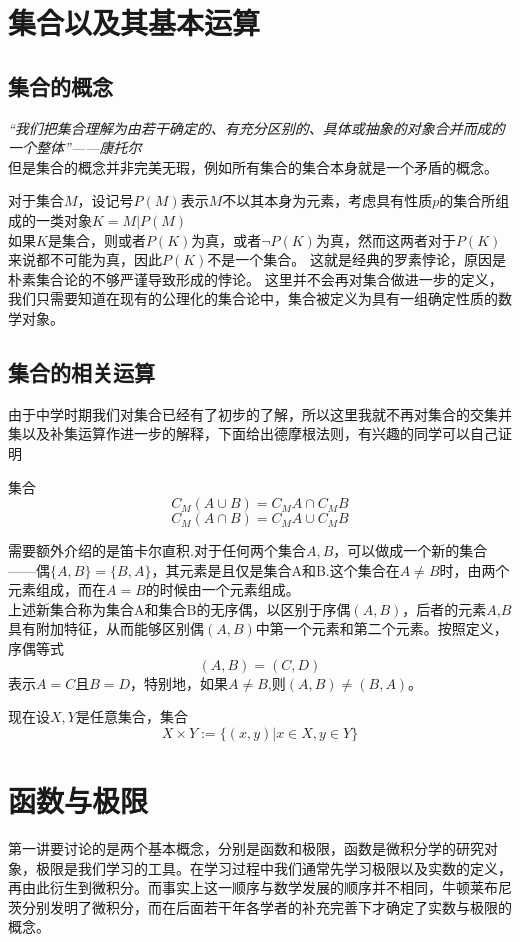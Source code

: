 \section{集合以及其基本运算}
\subsection{集合的概念}
{\large\textit{“我们把集合理解为由若干确定的、有充分区别的、具体或抽象的对象合并而成的一个整体”——康托尔}}\\


但是集合的概念并非完美无瑕，例如所有集合的集合本身就是一个矛盾的概念。

对于集合$M$，设记号$P(M)$表示$M$不以其本身为元素，考虑具有性质$p$的集合所组成的一类对象$K={M|P(M)}$\\
如果$K$是集合，则或者$P(K)$为真，或者$\neg P(K)$为真，然而这两者对于$P(K)$来说都不可能为真，因此$P(K)$不是一个集合。
这就是经典的罗素悖论，原因是朴素集合论的不够严谨导致形成的悖论。
这里并不会再对集合做进一步的定义，我们只需要知道在现有的公理化的集合论中，集合被定义为具有一组确定性质的数学对象。
\subsection{集合的相关运算}
由于中学时期我们对集合已经有了初步的了解，所以这里我就不再对集合的交集并集以及补集运算作进一步的解释，下面给出德摩根法则，有兴趣的同学可以自己证明
\begin{definition}{集合}{}
		\[C_M(A\cup   B)=C_MA\cap C_MB \]
        \[C_M(A\cap B)=C_MA\cup C_MB \]
	\end{definition}%
需要额外介绍的是笛卡尔直积.对于任何两个集合$A,B$，可以做成一个新的集合——偶$\{A,B\}=\{B,A\}$，其元素是且仅是集合A和B.这个集合在$A\neq B$时，由两个元素组成，而在$A=B$的时候由一个元素组成。\\

上述新集合称为集合A和集合B的无序偶，以区别于序偶$(A,B)$，后者的元素$A$,$B$具有附加特征，从而能够区别偶$(A,B)$中第一个元素和第二个元素。按照定义，序偶等式
\[(A,B)=(C,D)\]
表示$A=C$且$B=D$，特别地，如果$A\neq B$,则$(A,B)\neq (B,A)$。

现在设$X,Y$是任意集合，集合
\[X\times Y:=\{(x,y)|x\in X,y\in Y\}\]

\section{函数与极限}
第一讲要讨论的是两个基本概念，分别是函数和极限，函数是微积分学的研究对象，极限是我们学习的工具。在学习过程中我们通常先学习极限以及实数的定义，再由此衍生到微积分。而事实上这一顺序与数学发展的顺序并不相同，牛顿莱布尼茨分别发明了微积分，而在后面若干年各学者的补充完善下才确定了实数与极限的概念。
